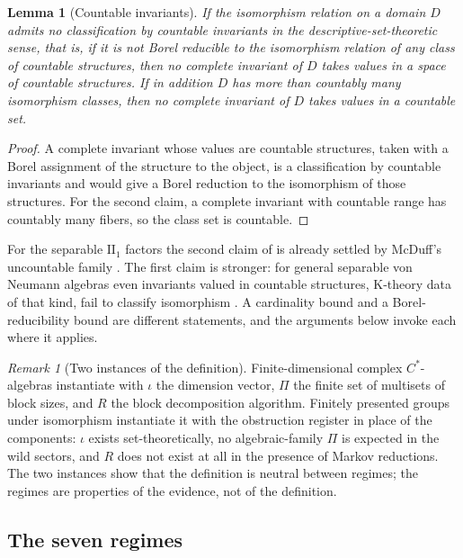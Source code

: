 \documentclass[11pt,letterpaper]{article}
\newtheorem{lemma}[theorem]{Lemma}
\theoremstyle{definition}
\theoremstyle{remark}
\newtheorem{remark}[theorem]{Remark}
\begin{document}
\begin{lemma}[Countable invariants]
\label{lem:countable}
If the isomorphism relation on a domain $D$ admits no classification by countable invariants in the descriptive-set-theoretic sense, that is, if it is not Borel reducible to the isomorphism relation of any class of countable structures, then no complete invariant of $D$ takes values in a space of countable structures. If in addition $D$ has more than countably many isomorphism classes, then no complete invariant of $D$ takes values in a countable set.
\end{lemma}

\begin{proof}
A complete invariant whose values are countable structures, taken with a Borel assignment of the structure to the object, is a classification by countable invariants and would give a Borel reduction to the isomorphism of those structures. For the second claim, a complete invariant with countable range has countably many fibers, so the class set is countable.
\end{proof}

For the separable $\mathrm{II}_1$ factors the second claim of  is already settled by McDuff's uncountable family \cite{mcduff1969}. The first claim is stronger: for general separable von Neumann algebras even invariants valued in countable structures, K-theory data of that kind, fail to classify isomorphism \cite{sasyk2009}. A cardinality bound and a Borel-reducibility bound are different statements, and the arguments below invoke each where it applies.

\begin{remark}[Two instances of the definition]
Finite-dimensional complex $C^*$-algebras instantiate  with $\iota$ the dimension vector, $\Pi$ the finite set of multisets of block sizes, and $R$ the block decomposition algorithm. Finitely presented groups under isomorphism instantiate it with the obstruction register in place of the components: $\iota$ exists set-theoretically, no algebraic-family $\Pi$ is expected in the wild sectors, and $R$ does not exist at all in the presence of Markov reductions. The two instances show that the definition is neutral between regimes; the regimes are properties of the evidence, not of the definition.
\end{remark}

\subsection{The seven regimes}
\end{document}
